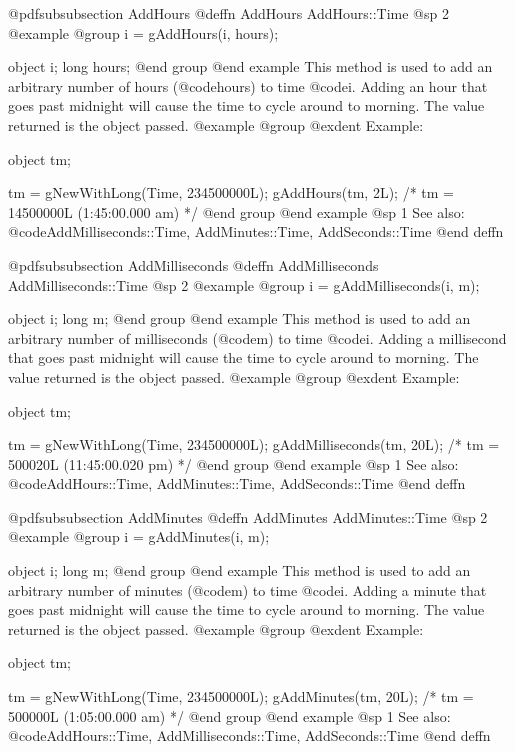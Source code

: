 @pdfsubsubsection {AddHours}
@deffn {AddHours} AddHours::Time
@sp 2
@example
@group
i = gAddHours(i, hours);

object  i;
long    hours;
@end group
@end example
This method is used to add an arbitrary number of hours (@code{hours}) to
time @code{i}.  Adding an hour that goes past midnight will cause the time
to cycle around to morning.  The value returned is the object passed.
@example
@group
@exdent Example:

object  tm;

tm = gNewWithLong(Time, 234500000L);
gAddHours(tm, 2L);  /* tm = 14500000L (1:45:00.000 am) */
@end group
@end example
@sp 1
See also:  @code{AddMilliseconds::Time, AddMinutes::Time, AddSeconds::Time}
@end deffn








@pdfsubsubsection {AddMilliseconds}
@deffn {AddMilliseconds} AddMilliseconds::Time
@sp 2
@example
@group
i = gAddMilliseconds(i, m);

object  i;
long    m;
@end group
@end example
This method is used to add an arbitrary number of milliseconds (@code{m}) to
time @code{i}.  Adding a millisecond that goes past midnight will cause the time
to cycle around to morning.  The value returned is the object passed.
@example
@group
@exdent Example:

object  tm;

tm = gNewWithLong(Time, 234500000L);
gAddMilliseconds(tm, 20L);
    /* tm = 500020L (11:45:00.020 pm) */
@end group
@end example
@sp 1
See also:  @code{AddHours::Time, AddMinutes::Time, AddSeconds::Time}
@end deffn











@pdfsubsubsection {AddMinutes}
@deffn {AddMinutes} AddMinutes::Time
@sp 2
@example
@group
i = gAddMinutes(i, m);

object  i;
long    m;
@end group
@end example
This method is used to add an arbitrary number of minutes (@code{m}) to
time @code{i}.  Adding a minute that goes past midnight will cause the time
to cycle around to morning.  The value returned is the object passed.
@example
@group
@exdent Example:

object  tm;

tm = gNewWithLong(Time, 234500000L);
gAddMinutes(tm, 20L);  /* tm = 500000L (1:05:00.000 am) */
@end group
@end example
@sp 1
See also:  @code{AddHours::Time, AddMilliseconds::Time, AddSeconds::Time}
@end deffn











